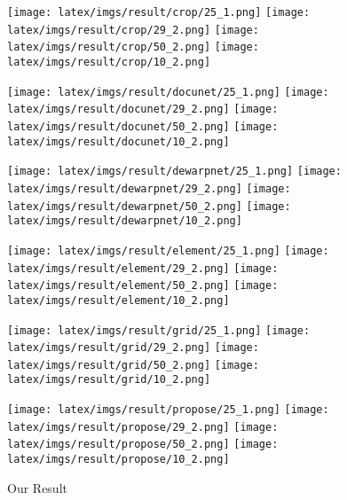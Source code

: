\documentclass[10pt,twocolumn,letterpaper]{article}
\begin{document}
\begin{figure*}[!t]
\centering
\begin{subfigure}[b]{1.0\linewidth}
\centering
    \begin{minipage}[b]{0.16\linewidth}
        \centering
        \texttt{[image: latex/imgs/result/crop/25\_1.png]}
        \texttt{[image: latex/imgs/result/crop/29\_2.png]}
        \texttt{[image: latex/imgs/result/crop/50\_2.png]}
        \texttt{[image: latex/imgs/result/crop/10\_2.png]}
        \caption{Original Image}
    \end{minipage}     
    \begin{minipage}[b]{0.16\linewidth}
        \centering
        \texttt{[image: latex/imgs/result/docunet/25\_1.png]}
        \texttt{[image: latex/imgs/result/docunet/29\_2.png]}
        \texttt{[image: latex/imgs/result/docunet/50\_2.png]}
        \texttt{[image: latex/imgs/result/docunet/10\_2.png]}
        \caption{DocUNet}
    \end{minipage}  
    \begin{minipage}[b]{0.16\linewidth}
        \centering
        \texttt{[image: latex/imgs/result/dewarpnet/25\_1.png]}
        \texttt{[image: latex/imgs/result/dewarpnet/29\_2.png]}
        \texttt{[image: latex/imgs/result/dewarpnet/50\_2.png]}
        \texttt{[image: latex/imgs/result/dewarpnet/10\_2.png]}
        \caption{DewarpNet}
    \end{minipage} 
     \begin{minipage}[b]{0.16\linewidth}
        \centering
        \texttt{[image: latex/imgs/result/element/25\_1.png]}
        \texttt{[image: latex/imgs/result/element/29\_2.png]}
        \texttt{[image: latex/imgs/result/element/50\_2.png]}
        \texttt{[image: latex/imgs/result/element/10\_2.png]}
        \caption{Geometric Elements}
    \end{minipage}  
    \begin{minipage}[b]{0.16\linewidth}
        \centering
        \texttt{[image: latex/imgs/result/grid/25\_1.png]}
        \texttt{[image: latex/imgs/result/grid/29\_2.png]}
        \texttt{[image: latex/imgs/result/grid/50\_2.png]}
        \texttt{[image: latex/imgs/result/grid/10\_2.png]}
        \caption{Deformation Grid}
    \end{minipage} 
    \begin{minipage}[b]{0.16\linewidth}
        \centering
        \texttt{[image: latex/imgs/result/propose/25\_1.png]}
        \texttt{[image: latex/imgs/result/propose/29\_2.png]}
        \texttt{[image: latex/imgs/result/propose/50\_2.png]} 
        \texttt{[image: latex/imgs/result/propose/10\_2.png]}    
        \caption{Our Result}
    \end{minipage} 
  

\end{subfigure}
\end{figure*}
\end{document}
